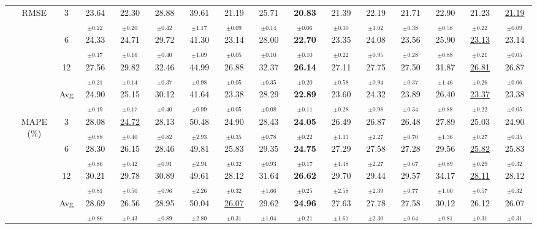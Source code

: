 \begin{table}[t]
{\begin{tabular}{ccc|ccc|cccc|cccc|cc}
\cmidrule(lr){2-16}
 & \multirow{4}{*}{RMSE} & 3 & 23.64$_{\pm0.22}$ & 22.30$_{\pm0.20}$ & 28.88$_{\pm0.42}$ & 39.61$_{\pm1.17}$ & 21.19$_{\pm0.09}$ & 25.71$_{\pm0.14}$ & \textbf{20.83$_{\pm0.06}$} & 21.39$_{\pm0.10}$ & 22.19$_{\pm1.02}$ & 21.71$_{\pm0.38}$ & 22.90$_{\pm0.58}$ & 21.23$_{\pm0.22}$ & \underline{21.19$_{\pm0.09}$} \\
 &  & 6 & 24.33$_{\pm0.17}$ & 24.71$_{\pm0.16}$ & 29.72$_{\pm0.40}$ & 41.30$_{\pm1.09}$ & 23.14$_{\pm0.05}$ & 28.00$_{\pm0.10}$ & \textbf{22.70$_{\pm0.10}$} & 23.35$_{\pm0.22}$ & 24.08$_{\pm0.95}$ & 23.56$_{\pm0.28}$ & 25.90$_{\pm0.88}$ & \underline{23.13$_{\pm0.21}$} & 23.14$_{\pm0.05}$ \\
 &  & 12 & 27.56$_{\pm0.21}$ & 29.82$_{\pm0.14}$ & 32.46$_{\pm0.37}$ & 44.99$_{\pm0.98}$ & 26.88$_{\pm0.05}$ & 32.37$_{\pm0.35}$ & \textbf{26.14$_{\pm0.20}$} & 27.11$_{\pm0.58}$ & 27.75$_{\pm0.94}$ & 27.50$_{\pm0.37}$ & 31.87$_{\pm1.46}$ & \underline{26.81$_{\pm0.26}$} & 26.87$_{\pm0.06}$ \\
 &  & Avg & 24.90$_{\pm0.19}$ & 25.15$_{\pm0.17}$ & 30.12$_{\pm0.40}$ & 41.64$_{\pm0.99}$ & 23.38$_{\pm0.05}$ & 28.29$_{\pm0.08}$ & \textbf{22.89$_{\pm0.11}$} & 23.60$_{\pm0.28}$ & 24.32$_{\pm0.98}$ & 23.89$_{\pm0.34}$ & 26.40$_{\pm0.88}$ & \underline{23.37$_{\pm0.22}$} & 23.38$_{\pm0.05}$ \\
\cmidrule(lr){2-16}
 & \multirow{4}{*}{MAPE (\%)} & 3 & 28.08$_{\pm0.88}$ & \underline{24.72$_{\pm0.40}$} & 28.13$_{\pm0.82}$ & 50.48$_{\pm2.93}$ & 24.90$_{\pm0.35}$ & 28.43$_{\pm0.78}$ & \textbf{24.05$_{\pm0.22}$} & 26.49$_{\pm1.13}$ & 26.87$_{\pm2.27}$ & 26.48$_{\pm0.70}$ & 27.89$_{\pm1.36}$ & 25.03$_{\pm0.27}$ & 24.90$_{\pm0.35}$ \\
 &  & 6 & 28.30$_{\pm0.86}$ & 26.15$_{\pm0.42}$ & 28.46$_{\pm0.91}$ & 49.81$_{\pm2.94}$ & 25.83$_{\pm0.32}$ & 29.35$_{\pm0.93}$ & \textbf{24.75$_{\pm0.17}$} & 27.29$_{\pm1.48}$ & 27.58$_{\pm2.27}$ & 27.28$_{\pm0.67}$ & 29.56$_{\pm0.89}$ & \underline{25.82$_{\pm0.29}$} & 25.83$_{\pm0.32}$ \\
 &  & 12 & 30.21$_{\pm0.81}$ & 29.78$_{\pm0.50}$ & 30.89$_{\pm0.96}$ & 49.61$_{\pm2.26}$ & 28.12$_{\pm0.32}$ & 31.64$_{\pm1.66}$ & \textbf{26.62$_{\pm0.25}$} & 29.70$_{\pm2.58}$ & 29.44$_{\pm2.39}$ & 29.57$_{\pm0.77}$ & 34.17$_{\pm1.00}$ & \underline{28.11$_{\pm0.57}$} & 28.12$_{\pm0.32}$ \\
 &  & Avg & 28.69$_{\pm0.86}$ & 26.56$_{\pm0.43}$ & 28.95$_{\pm0.89}$ & 50.04$_{\pm2.80}$ & \underline{26.07$_{\pm0.31}$} & 29.62$_{\pm1.04}$ & \textbf{24.96$_{\pm0.21}$} & 27.63$_{\pm1.67}$ & 27.78$_{\pm2.30}$ & 27.58$_{\pm0.64}$ & 30.12$_{\pm0.81}$ & 26.12$_{\pm0.31}$ & 26.07$_{\pm0.31}$ \\

\end{tabular}}
\end{table}
